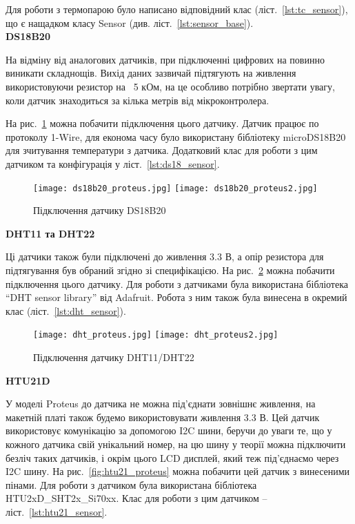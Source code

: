 Для роботи з термопарою було написано відповідний клас (ліст.~\ref{lst:tc_sensor}), що є нащадком класу Sensor (див. ліст.~\ref{lst:sensor_base}).\\ 

\textbf{DS18B20}\bigskip

На відміну від аналогових датчиків, при підключенні цифрових на повинно виникати складнощів. Вихід даних зазвичай підтягують на живлення використовуючи резистор на ~5 кОм, на це особливо потрібно звертати увагу, коли датчик знаходиться за кілька метрів від мікроконтролера.

На рис.~\ref{fig:ds18b20_proteus} можна побачити підключення цього датчику. Датчик працює по протоколу 1-Wire, для економа часу було використану бібліотеку microDS18B20 для зчитування температури з датчика. Додатковий клас для роботи з цим датчиком та конфігурація у ліст.~\ref{lst:ds18_sensor}.

\begin{figure}[H]
    \centering
    \texttt{[image: ds18b20\_proteus.jpg]}
    \texttt{[image: ds18b20\_proteus2.jpg]}
    \caption{Підключення датчику DS18B20}
    \label{fig:ds18b20_proteus}
\end{figure}

\textbf{DHT11 та DHT22}\bigskip

Ці датчики також були підключені до живлення 3.3 В, а опір резистора для підтягування був обраний згідно зі специфікацією. На рис.~\ref{fig:dht_proteus} можна побачити підключення цього датчику. Для роботи з датчиками була використана бібліотека ``DHT sensor library'' від Adafruit. Робота з ним також була винесена в окремий клас (ліст.~\ref{lst:dht_sensor}).

\begin{figure}[ht]
    \centering
    \texttt{[image: dht\_proteus.jpg]}
    \texttt{[image: dht\_proteus2.jpg]}
    \caption{Підключення датчику DHT11/DHT22}
    \label{fig:dht_proteus}
\end{figure}
\clearpage
\textbf{HTU21D}\bigskip

У моделі Proteus до датчика не можна під'єднати зовнішнє живлення, на макетній платі також будемо використовувати живлення 3.3 В. Цей датчик використовує комунікацію за допомогою I2C шини, беручи до уваги те, що у кожного датчика свій унікальний номер, на цю шину у теорії можна підключити безліч таких датчиків, і окрім цього LCD дисплей, який теж під'єднаємо через I2C шину. На рис.~\ref{fig:htu21_proteus} можна побачити цей датчик з винесеними пінами. Для роботи з датчиком була використана бібліотека HTU2xD\_SHT2x\_Si70xx. Клас для роботи з цим датчиком -- ліст.~\ref{lst:htu21_sensor}.

